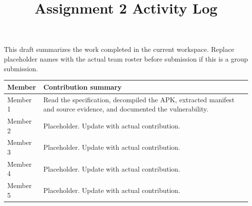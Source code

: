 \documentclass[11pt,letterpaper]{article}
\title{Assignment 2 Activity Log}
\author{}
\date{}
\begin{document}
\maketitle
\thispagestyle{empty}

This draft summarizes the work completed in the current workspace. Replace placeholder names with the actual team roster before submission if this is a group submission.

\vspace{0.5em}

\begin{longtable}{|p{}|p{}|}
\hline
\textbf{Member} & \textbf{Contribution summary} \\
\hline
Member 1 & Read the specification, decompiled the APK, extracted manifest and source evidence, and documented the vulnerability. \\
\hline
Member 2 & Placeholder. Update with actual contribution. \\
\hline
Member 3 & Placeholder. Update with actual contribution. \\
\hline
Member 4 & Placeholder. Update with actual contribution. \\
\hline
Member 5 & Placeholder. Update with actual contribution. \\
\hline
\end{longtable}
\end{document}
